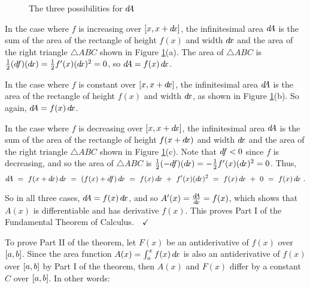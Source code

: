 \begin{figure}[ht]
{}
 \caption[]{\quad The three possibilities for $d\negmedspace A$}
 \label{fig:ftc1dA3}
\end{figure}

In the case where $f$ is increasing over $\lbrack x,x+d\!x \rbrack$, the infinitesimal
area $d\negmedspace A$ is the sum of the area of the rectangle of height $f(x)$ and width
$d\!x$ and the area of the right triangle $\triangle ABC$ shown in Figure
\ref{fig:ftc1dA3}(a). The area of $\triangle ABC$ is $\frac{1}{2}(d\negmedspace f)(d\!x)
= \frac{1}{2}f'(x)(d\!x)^2 = 0$, so $d\negmedspace A = f(x)\,d\!x$.

In the case where $f$ is constant over $\lbrack x,x+d\!x \rbrack$, the infinitesimal
area $d\negmedspace A$ is the area of the rectangle of height $f(x)$ and width $d\!x$, as
shown in Figure \ref{fig:ftc1dA3}(b). So again, $d\negmedspace A = f(x)\,d\!x$.

In the case where $f$ is decreasing over $\lbrack x,x+d\!x \rbrack$, the infinitesimal
area $d\negmedspace A$ is the sum of the area of the rectangle of height $f(x+d\!x)$ and
width $d\!x$ and the area of the right triangle $\triangle ABC$ shown in Figure
\ref{fig:ftc1dA3}(c). Note that $d\negmedspace f < 0$ since $f$ is decreasing, and so the
area of $\triangle ABC$ is $\frac{1}{2}(-d\negmedspace f)(d\!x) = -\frac{1}{2}f'(x)(d\!x)^2
= 0$. Thus,
\[
\dA ~=~ f(x+\dx)\,\dx ~=~ (f(x) + \df)\,\dx ~=~
        f(x)\,\dx ~+~ f'(x)(\dx)^2 ~=~ f(x)\,\dx ~+~ 0 ~=~ f(x)\,\dx ~.
\]

So in all three cases, $d\negmedspace A = f(x)\,d\!x$, and so $A'(x) = \frac{d\negmedspace A}{d\!x} = f(x)$,
which shows that $A(x)$ is differentiable and has derivative $f(x)$.
This proves Part I of the Fundamental Theorem of Calculus.$\quad\checkmark$

To prove Part II of the theorem, let $F(x)$ be an antiderivative of $f(x)$ over
$\lbrack a,b \rbrack$. Since the area function $A(x) = \int_a^x f(x)\,d\!x$ is also an
antiderivative of
$f(x)$ over $\lbrack a,b \rbrack$ by Part I of the theorem, then $A(x)$ and $F(x)$
differ by a constant $C$ over $\lbrack a,b \rbrack$. In other words:

